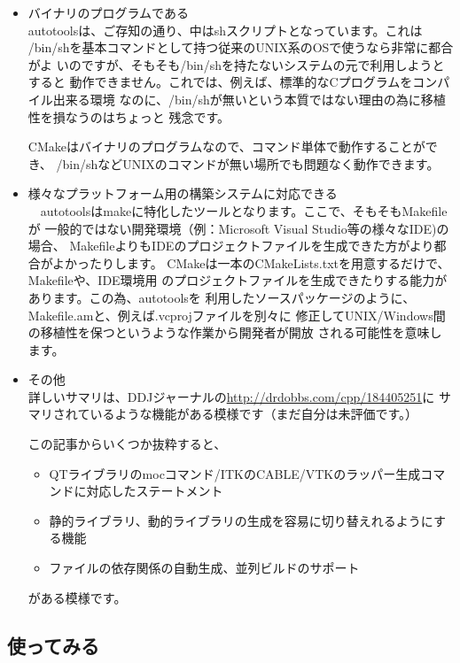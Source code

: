 \documentclass[mingoth,a4paper]{jsarticle}
\begin{document}
\begin{itemize}
\item バイナリのプログラムである\\
autotoolsは、ご存知の通り、中はshスクリプトとなっています。これは
/bin/shを基本コマンドとして持つ従来のUNIX系のOSで使うなら非常に都合がよ
いのですが、そもそも/bin/shを持たないシステムの元で利用しようとすると
動作できません。これでは、例えば、標準的なCプログラムをコンパイル出来る環境
なのに、/bin/shが無いという本質ではない理由の為に移植性を損なうのはちょっと
残念です。

CMakeはバイナリのプログラムなので、コマンド単体で動作することができ、
/bin/shなどUNIXのコマンドが無い場所でも問題なく動作できます。

\item 様々なプラットフォーム用の構築システムに対応できる\\
　autotoolsはmakeに特化したツールとなります。ここで、そもそもMakefileが
一般的ではない開発環境（例：Microsoft Visual Studio等の様々なIDE)の場合、
MakefileよりもIDEのプロジェクトファイルを生成できた方がより都合がよかったりします。
CMakeは一本のCMakeLists.txtを用意するだけで、Makefileや、IDE環境用
のプロジェクトファイルを生成できたりする能力があります。この為、autotoolsを
利用したソースパッケージのように、Makefile.amと、例えば.vcprojファイルを別々に
修正してUNIX/Windows間の移植性を保つというような作業から開発者が開放
される可能性を意味します。

\item その他\\
 詳しいサマリは、DDJジャーナルの\url{http://drdobbs.com/cpp/184405251}に
サマリされているような機能がある模様です（まだ自分は未評価です。）

この記事からいくつか抜粋すると、

\begin{itemize}
\item QTライブラリのmocコマンド/ITKのCABLE/VTKのラッパー生成コマンドに対応したステートメント
\item 静的ライブラリ、動的ライブラリの生成を容易に切り替えれるようにする機能
\item ファイルの依存関係の自動生成、並列ビルドのサポート
\end{itemize}

がある模様です。
\end{itemize}

\subsection{使ってみる}
\end{document}
